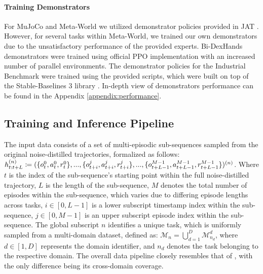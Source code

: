 \documentclass{article}
\theoremstyle{plain}
\theoremstyle{definition}
\theoremstyle{remark}
\begin{document}
\paragraph{Training Demonstrators} For MuJoCo and Meta-World we utilized demonstrator policies provided in JAT \cite{gallouédec2024jacktradesmastersome}. However, for several tasks within Meta-World, we trained our own demonstrators due to the unsatisfactory performance of the provided experts. Bi-DexHands demonstrators were trained using official PPO \cite{schulman2017proximalpolicyoptimizationalgorithms} implementation with an increased number of parallel environments. The demonstrator policies for the Industrial Benchmark were trained using the provided scripts, which were built on top of the Stable-Baselines 3 library \cite{stable-baselines3}. In-depth view of demonstrators performance can be found in the Appendix \ref{appendix:performance}.
\subsection{Training and Inference Pipeline}
The input data consists of a set of multi-episodic sub-sequences sampled from the original noise-distilled trajectories, formalized as follows: $ \\ h_{t:t+L}^{(n)} \coloneqq (\{o_{t}^{0}, a_{t}^{0}, r_{t}^{0}\},...,\{o_{t+i}^{j}, a_{t+i}^{j}, r_{t+i}^{j}\},... \\, \{o_{t+L-1}^{M-1}, a_{t+L-1}^{M-1}, r_{t+L-1}^{M-1}\})^{(n)}$. Where $t$ is the index of the sub-sequence's starting point within the full noise-distilled trajectory, $L$ is the length of the sub-sequence, $M$ denotes the total number of episodes within the sub-sequence, which varies due to differing episode lengths across tasks, $i \in [0, L-1]$ is a lower subscript timestamp index within the sub-sequence, $j \in [0, M-1]$ is an upper subscript episode index within the sub-sequence. The global subscript $n$ identifies a unique task, which is uniformly sampled from a multi-domain dataset, defined as: $\mathcal{M}_{n} = \bigcup_{d=1}^{D} \mathcal{M}_{n_d}^{d}$, where $d \in [1, D]$ represents the domain identifier, and
$n_d$ denotes the task belonging to the respective domain. The overall data pipeline closely resembles that of \citet{laskin2022incontextreinforcementlearningalgorithm}, with the only difference being its cross-domain coverage.
\end{document}
